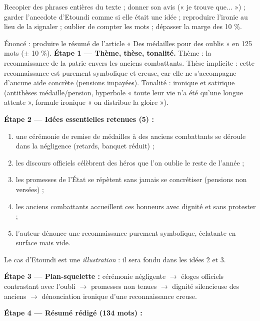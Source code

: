 \documentclass[11pt]{article}
\newcounter{popsec}
\newcounter{popsub}
\newcommand{\courssub}[1]{%
  \stepcounter{popsub}%
  \par\vspace{9pt}\noindent{\popxbold\fontsize{11.5}{13}\selectfont\color{popink}{\color{poporange}\thepopsec.\thepopsub}\hspace{6pt}#1}\par\nopagebreak\vspace{4pt}
}
\begin{document}
\begin{attention}
Recopier des phrases entières du texte ; donner son avis (« je trouve que... ») ; garder l'anecdote d'Etoundi comme si elle était une idée ; reproduire l'ironie au lieu de la signaler ; oublier de compter les mots ; dépasser la marge des 10 \%.
\end{attention}

\courssub{Démarche et corrigé commenté}

\begin{exoresolu}
Énoncé : produire le résumé de l'article « Des médailles pour des oublis » en 125 mots ($\pm$ 10 \%).
\tcblower
\textbf{Étape 1 — Thème, thèse, tonalité.} Thème : la reconnaissance de la patrie envers les anciens combattants. Thèse implicite : cette reconnaissance est purement symbolique et creuse, car elle ne s'accompagne d'aucune aide concrète (pensions impayées). Tonalité : ironique et satirique (antithèses médaille/pension, hyperbole « toute leur vie n'a été qu'une longue attente », formule ironique « on distribue la gloire »).

\textbf{Étape 2 — Idées essentielles retenues (5) :}
\begin{enumerate}
\item une cérémonie de remise de médailles à des anciens combattants se déroule dans la négligence (retards, banquet réduit) ;
\item les discours officiels célèbrent des héros que l'on oublie le reste de l'année ;
\item les promesses de l'État se répètent sans jamais se concrétiser (pensions non versées) ;
\item les anciens combattants accueillent ces honneurs avec dignité et sans protester ;
\item l'auteur dénonce une reconnaissance purement symbolique, éclatante en surface mais vide.
\end{enumerate}
Le cas d'Etoundi est une \emph{illustration} : il sera fondu dans les idées 2 et 3.

\textbf{Étape 3 — Plan-squelette :} cérémonie négligente $\rightarrow$ éloges officiels contrastant avec l'oubli $\rightarrow$ promesses non tenues $\rightarrow$ dignité silencieuse des anciens $\rightarrow$ dénonciation ironique d'une reconnaissance creuse.

\textbf{Étape 4 — Résumé rédigé (134 mots) :}


\end{exoresolu}
\end{document}
